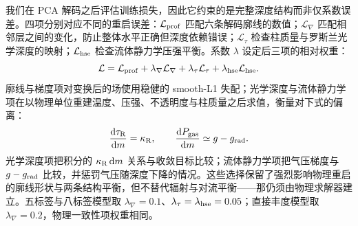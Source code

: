 我们在 PCA 解码之后评估训练损失，因此它约束的是完整深度结构而非仅系数误差。四项分别对应不同的重启误差：$\mathcal{L}_{\rm prof}$ 匹配六条解码廓线的数值；$\mathcal{L}_{\nabla}$ 匹配相邻层之间的变化，防止整体水平正确但深度依赖错误；$\mathcal{L}_{\tau}$ 检查柱质量与罗斯兰光学深度的映射；$\mathcal{L}_{\rm hse}$ 检查流体静力学压强平衡。系数 $\lambda$ 设定后三项的相对权重：
\begin{equation}
\mathcal{L}
=\mathcal{L}_{\rm prof}
+\lambda_{\nabla}\mathcal{L}_{\nabla}
+\lambda_{\tau}\mathcal{L}_{\tau}
+\lambda_{\rm hse}\mathcal{L}_{\rm hse}.
\end{equation}
\noindent 廓线与梯度项对变换后的场使用稳健的 smooth-L1 失配；光学深度与流体静力学项在以物理单位重建温度、压强、不透明度与柱质量之后求值，衡量对下式的偏离：
\begin{equation}
\frac{\mathrm{d}\tau_{\rm R}}{\mathrm{d}m}=\kappa_{\rm R},
\qquad
\frac{\mathrm{d}P_{\rm gas}}{\mathrm{d}m}\simeq g-g_{\rm rad}.
\end{equation}
\noindent 光学深度项把积分的 $\kappa_{\rm R}\,\mathrm{d}m$ 关系与收敛目标比较；流体静力学项把气压梯度与 $g-g_{\rm rad}$ 比较，并惩罚气压随深度下降的情况。这些选择保留了强烈影响物理重启的廓线形状与两条结构平衡，但不替代辐射与对流平衡——那仍须由物理求解器建立。五标签与八标签模型取 $\lambda_{\nabla}=0.1$、$\lambda_{\tau}=\lambda_{\rm hse}=0.05$；直接丰度模型取 $\lambda_{\nabla}=0.2$，物理一致性项权重相同。

